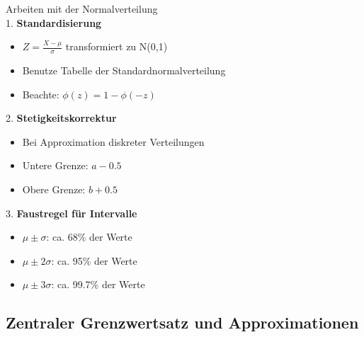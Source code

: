 \begin{KR}{Arbeiten mit der Normalverteilung}\\
1. \textbf{Standardisierung}
   \begin{itemize}
   \item $Z = \frac{X-\mu}{\sigma}$ transformiert zu N(0,1)
   \item Benutze Tabelle der Standardnormalverteilung
   \item Beachte: $\phi(z) = 1 - \phi(-z)$
   \end{itemize}

2. \textbf{Stetigkeitskorrektur}
   \begin{itemize}
   \item Bei Approximation diskreter Verteilungen
   \item Untere Grenze: $a - 0.5$
   \item Obere Grenze: $b + 0.5$
   \end{itemize}

3. \textbf{Faustregel für Intervalle}
   \begin{itemize}
   \item $\mu \pm \sigma$: ca. 68\% der Werte
   \item $\mu \pm 2\sigma$: ca. 95\% der Werte
   \item $\mu \pm 3\sigma$: ca. 99.7\% der Werte
   \end{itemize}
\end{KR}

\subsection{Zentraler Grenzwertsatz und Approximationen}



